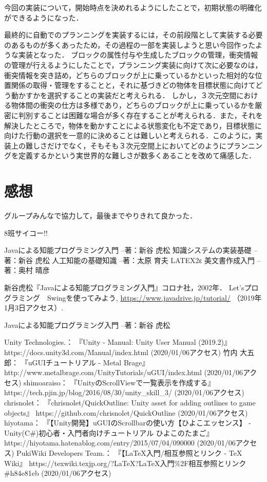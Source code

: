 \documentclass[12pt]{jarticle}
\begin{document}
今回の実装について，開始時点を決めれるようにしたことで，初期状態の明確化ができるようになった．

最終的に自動でのプランニングを実装するには，その前段階として実装する必要のあるものが多くあったため，その過程の一部を実装しようと思い今回作ったような実装となった．
ブロックの属性付与や生成したブロックの管理，衝突情報の管理が行えるようにしたことで，プランニング実装に向けて次に必要なのは，衝突情報を突き詰め，どちらのブロックが上に乗っているかといった相対的な位置関係の取得・管理をすることと，それに基づきどの物体を目標状態に向けてどう動かすかを選択することの実装だと考えられる．
しかし，３次元空間における物体間の衝突の仕方は多様であり，どちらのブロックが上に乗っているかを厳密に判別することは困難な場合が多く存在することが考えられる．また，それを解決したところで，物体を動かすことによる状態変化も不定であり，目標状態に向けた行動の選択を一意的に決めることは難しいと考えられる．このように，実装上の難しさだけでなく，そもそも３次元空間上においてどのようにプランニングを定義するかという実世界的な難しさが数多くあることを改めて痛感した．


\section{感想}
グループみんなで協力して，最後までやりきれて良かった．

8班サイコー!!

\begin{thebibliography}{99}
 Javaによる知能プログラミング入門 --著：新谷 虎松
 知識システムの実装基礎 --著：新谷 虎松
 人工知能の基礎知識 --著：太原 育夫
 LATEX2ε 美文書作成入門 --著：奥村 晴彦

 新谷虎松『Javaによる知能プログラミング入門』コロナ社，2002年．
 Let'sプログラミング　Swingを使ってみよう, \url{https://www.javadrive.jp/tutorial/} （2019年1月3日アクセス）.

 Javaによる知能プログラミング入門 --著：新谷 虎松

 Unity Technologies.： 『Unity - Manual: Unity User Manual (2019.2)』 https://docs.unity3d.com/Manual/index.html (2020/01/06アクセス)
 竹内 大五郎： 『uGUIチュートリアル - Metal Brage』 http://www.metalbrage.com/UnityTutorials/uGUI/index.html (2020/01/06アクセス)
 shimoaraiso： 『UnityのScrollViewで一覧表示を作成する』 https://tech.pjin.jp/blog/2016/08/30/unity\_skill\_3/ (2020/01/06アクセス)
 chrisnolet： 『chrisnolet/QuickOutline: Unity asset for adding outlines to game objects』 https://github.com/chrisnolet/QuickOutline (2020/01/06アクセス)
 hiyotama： 『【Unity開発】uGUIのScrollbarの使い方【ひよこエッセンス】 - Unity(C\#)初心者・入門者向けチュートリアル ひよこのたまご』 https://hiyotama.hatenablog.com/entry/2015/07/04/090000 (2020/01/06アクセス)
 PukiWiki Developers Team.： 『【LaTeX入門/相互参照とリンク - TeX Wiki』 https://texwiki.texjp.org/?LaTeX?LaTeX入門\%2F相互参照とリンク\#h84e81eb (2020/01/06アクセス)
\end{thebibliography}
\end{document}
